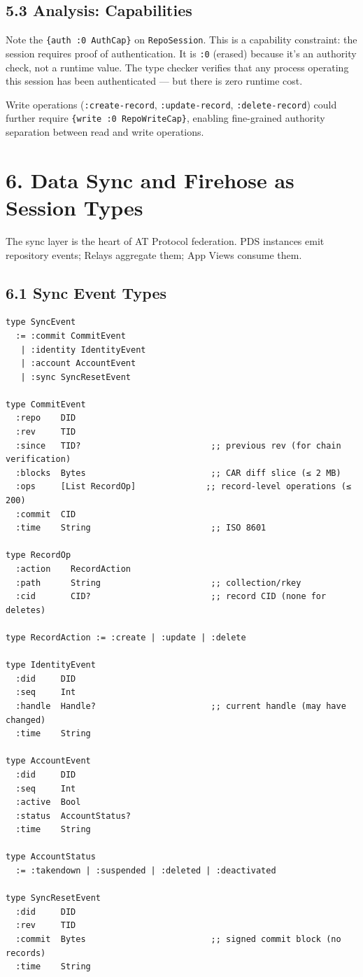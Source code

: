 \documentclass[11pt]{article}
\begin{document}
\subsection{5.3 Analysis: Capabilities}
\label{sec:org1fd9eb3}

Note the \texttt{\{auth :0 AuthCap\}} on \texttt{RepoSession}. This is a capability
constraint: the session requires proof of authentication. It is \texttt{:0} (erased)
because it's an authority check, not a runtime value. The type checker
verifies that any process operating this session has been authenticated ---
but there is zero runtime cost.

Write operations (\texttt{:create-record}, \texttt{:update-record}, \texttt{:delete-record})
could further require \texttt{\{write :0 RepoWriteCap\}}, enabling fine-grained
authority separation between read and write operations.
\section{6. Data Sync and Firehose as Session Types}
\label{sec:org24c1851}

The sync layer is the heart of AT Protocol federation. PDS instances emit
repository events; Relays aggregate them; App Views consume them.
\subsection{6.1 Sync Event Types}
\label{sec:org77d4455}

\begin{verbatim}
type SyncEvent
  := :commit CommitEvent
   | :identity IdentityEvent
   | :account AccountEvent
   | :sync SyncResetEvent

type CommitEvent
  :repo    DID
  :rev     TID
  :since   TID?                          ;; previous rev (for chain verification)
  :blocks  Bytes                         ;; CAR diff slice (≤ 2 MB)
  :ops     [List RecordOp]              ;; record-level operations (≤ 200)
  :commit  CID
  :time    String                        ;; ISO 8601

type RecordOp
  :action    RecordAction
  :path      String                      ;; collection/rkey
  :cid       CID?                        ;; record CID (none for deletes)

type RecordAction := :create | :update | :delete

type IdentityEvent
  :did     DID
  :seq     Int
  :handle  Handle?                       ;; current handle (may have changed)
  :time    String

type AccountEvent
  :did     DID
  :seq     Int
  :active  Bool
  :status  AccountStatus?
  :time    String

type AccountStatus
  := :takendown | :suspended | :deleted | :deactivated

type SyncResetEvent
  :did     DID
  :rev     TID
  :commit  Bytes                         ;; signed commit block (no records)
  :time    String
\end{verbatim}
\end{document}
